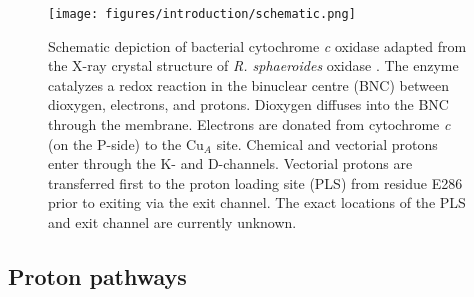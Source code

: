 \begin{figure}[htbp]
\centering
\texttt{[image: figures/introduction/schematic.png]}
\caption[Schematic depiction of bacterial cytochrome \emph{c} oxidase adapted from the X-ray crystal structure of \emph{R. sphaeroides} oxidase.]{Schematic depiction of bacterial cytochrome \emph{c} oxidase adapted from the X-ray crystal structure of \emph{R. sphaeroides} oxidase \cite{SvenssonEk:2002p5595}. The enzyme catalyzes a redox reaction in the binuclear centre (BNC) between dioxygen, electrons, and protons. Dioxygen diffuses into the BNC through the membrane. Electrons are donated from cytochrome \emph{c} (on the P-side) to the Cu$_A$ site. Chemical and vectorial protons enter through the K- and D-channels. Vectorial protons are transferred first to the proton loading site (PLS) from residue E286 prior to exiting via the exit channel. The exact locations of the PLS and exit channel are currently unknown.}
\label{fig:schematic}
\end{figure}

\subsection{Proton pathways}

